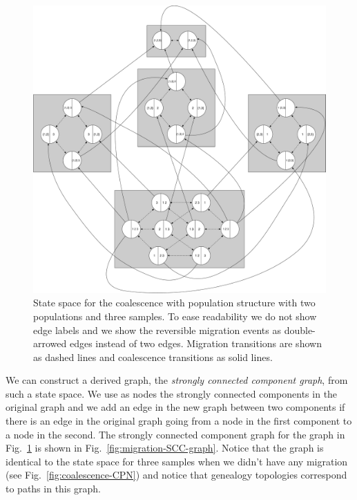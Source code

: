 \documentclass[graybox]{svmult}
\begin{document}
\begin{figure}[t]
\sidecaption
\includegraphics[scale=.20]{figures/migration-state-space-3}
\caption{State space for the coalescence with population structure with two populations and three samples. To ease readability we do not show edge labels and we show the reversible migration events as double-arrowed edges instead of two edges. Migration transitions are shown as dashed lines and coalescence transitions as solid lines.}
\label{fig:migration-state-space-3}
\end{figure}

We can construct a derived graph, the \emph{strongly connected component graph}, from such a state space. We use as nodes the strongly connected components in the original graph and we add an edge in the new graph between two components if there is an edge in the original graph going from a node in the first component to a node in the second. The strongly connected component graph for the graph in Fig.~\ref{fig:migration-state-space-3} is shown in Fig.~\ref{fig:migration-SCC-graph}. Notice that the graph is identical to the state space for three samples when we didn't have any migration (see Fig.~\ref{fig:coalescence-CPN}) and notice that genealogy topologies correspond to paths in this graph.
\end{document}
